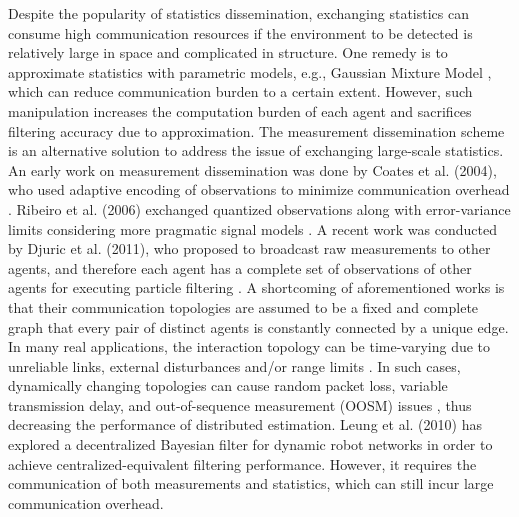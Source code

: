 	
	Despite the popularity of statistics dissemination, exchanging statistics can consume high communication resources if the environment to be detected is relatively large in space and complicated in structure. 
	One remedy is to approximate statistics with parametric models, e.g., Gaussian Mixture Model \cite{sheng2005distributed}, which can reduce communication burden to a certain extent. 
	However, such manipulation increases the computation burden of each agent and sacrifices filtering  accuracy due to approximation.
	The measurement dissemination scheme is an alternative solution to address the issue of exchanging large-scale statistics. 
	An early work on measurement dissemination was done by Coates et al. (2004), who used adaptive encoding of observations to minimize communication overhead \cite{coates2004distributed}. Ribeiro et al. (2006) exchanged quantized observations along with error-variance limits considering more pragmatic signal models \cite{ribeiro2006bandwidth}.
	A recent work was conducted by Djuric et al. (2011), who proposed to broadcast raw measurements to other agents, and therefore each agent has a complete set of observations of other agents for executing particle filtering \cite{djuric2011non}.  
	A shortcoming of aforementioned works is that their communication topologies are assumed to be a fixed and complete graph that every pair of distinct agents is constantly connected by a unique edge. 
	In many real applications, the interaction topology can be time-varying due to unreliable links, external disturbances and/or range limits \cite{xiao2008asynchronous}.
	In such cases, dynamically changing topologies can cause random packet loss, variable transmission delay, and out-of-sequence measurement (OOSM) issues \cite{xia2009networked}, thus decreasing the performance of distributed estimation.
	Leung et al. (2010) has explored a decentralized Bayesian filter for dynamic robot networks \cite{leung2010decentralized} in order to achieve centralized-equivalent filtering performance.
	However, it requires the communication of both measurements and statistics, which can still incur large communication overhead.
		
